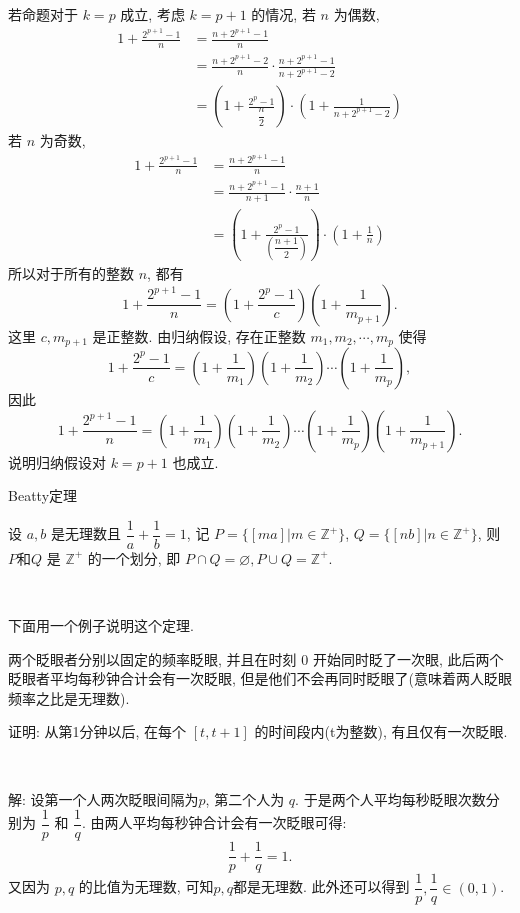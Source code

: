 若命题对于 $k=p$ 成立, 考虑 $k=p+1$ 的情况, 若 $n$ 为偶数,
\begin{align*}
1 + \frac{2^{p+1}-1}{n} &= \frac{n+2^{p+1}-1}{n} \\
&= \frac{n+2^{p+1}-2}{n}\cdot\frac{n+2^{p+1}-1}{n+2^{p+1}-2}\\
&= \left(1+\frac{2^p-1}{\dfrac{n}{2}}\right)\cdot\left(1+\frac{1}{n+2^{p+1}-2}\right)
\end{align*}
若 $n$ 为奇数, 
\begin{align*}
1 + \frac{2^{p+1}-1}{n}  &= \frac{n+2^{p+1}-1}{n} \\
&= \frac{n+2^{p+1}-1}{n+1}\cdot\frac{n+1}{n}\\
&= \left(1+\frac{2^p-1}{(\dfrac{n+1}{2})}\right)\cdot\left(1+\frac{1}{n}\right)
\end{align*}
所以对于所有的整数 $n$, 都有
\[1+\frac{2^{p+1}-1}{n} = \left(1+\frac{2^p-1}{c}\right)\left(1+\frac{1}{m_{p+1}}\right) .\]
这里 $c, m_{p+1}$ 是正整数. 由归纳假设, 存在正整数 $m_1,m_2,\cdots,m_p$ 使得
\[1+\frac{2^p-1}{c} = \left(1+\frac{1}{m_1}\right)\left(1+\frac{1}{m_2}\right)\cdots\left(1+\frac{1}{m_p}\right) ,\]
因此
\[1+\frac{2^{p+1}-1}{n} = \left(1+\frac{1}{m_1}\right)\left(1+\frac{1}{m_2}\right)\cdots\left(1+\frac{1}{m_p}\right)\left(1+\frac{1}{m_{p+1}}\right) .\]
说明归纳假设对 $k=p+1$ 也成立.

\newpage
\noindent Beatty定理

设 $a,b$ 是无理数且 $\dfrac{1}{a} + \dfrac{1}{b} = 1$, 记 $P = \{[ma] | m\in\mathbb{Z}^+\}$, $Q = \{[nb] | n\in\mathbb{Z}^+\}$, 则 $P$和$Q$ 是 $\mathbb{Z}^+$ 的一个划分, 即 $P\cap Q = \varnothing, P\cup Q = \mathbb{Z}^+$.

~

\noindent 下面用一个例子说明这个定理. 

两个眨眼者分别以固定的频率眨眼, 并且在时刻 0 开始同时眨了一次眼, 此后两个眨眼者平均每秒钟合计会有一次眨眼, 但是他们不会再同时眨眼了(意味着两人眨眼频率之比是无理数).

证明: 从第1分钟以后, 在每个 $[t,t+1]$ 的时间段内(t为整数), 有且仅有一次眨眼.

~

解: 设第一个人两次眨眼间隔为$p$, 第二个人为 $q$. 于是两个人平均每秒眨眼次数分别为 $\dfrac{1}{p}$ 和 $\dfrac{1}{q}$. 由两人平均每秒钟合计会有一次眨眼可得:
\[\frac{1}{p}+\frac{1}{q} = 1 .\]
又因为 $p,q$ 的比值为无理数, 可知$p,q$都是无理数. 此外还可以得到 $\dfrac{1}{p},\dfrac{1}{q}\in(0,1)$.

